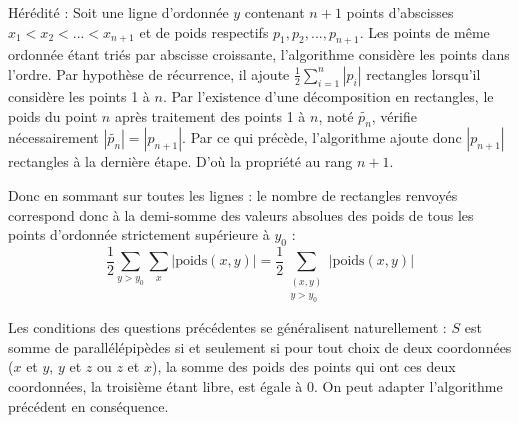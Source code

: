 Hérédité : Soit une ligne d'ordonnée $y$ contenant $n+1$ points d'abscisses $x_1 < x_2 < ... < x_{n+1}$ et de poids respectifs $p_1, p_2, ..., p_{n+1}$. Les points de même ordonnée étant triés par abscisse croissante, l'algorithme considère les points dans l'ordre. Par hypothèse de récurrence, il ajoute $\frac{1}{2} \sum_{i=1}^n|p_i|$ rectangles lorsqu'il considère les points 1 à $n$. Par l'existence d'une décomposition en rectangles, le poids du point $n$ après traitement des points 1 à $n$, noté $\tilde{p_n}$, vérifie nécessairement $|\tilde{p_n}|=|p_{n+1}|$. Par ce qui précède, l'algorithme ajoute donc $|p_{n+1}|$ rectangles à la dernière étape. D'où la propriété au rang $n+1$.
\medskip

Donc en sommant sur toutes les lignes : le nombre de rectangles renvoyés correspond donc à la demi-somme des valeurs absolues des poids de tous les points d'ordonnée strictement supérieure à $y_0$ :
\[
    \frac{1}{2} \sum_{y>y_0}\sum_{x}|\textrm{poids}(x,y)|=\frac{1}{2}\sum_{\substack{(x,y) \\ y>y_0}}|\textrm{poids}(x,y)|
\]

\Q
Les conditions des questions précédentes se généralisent naturellement : $S$ est somme de parallélépipèdes si et seulement si pour tout choix de deux coordonnées ($x$ et $y$, $y$ et $z$ ou $z$ et $x$), la somme des poids des points qui ont ces deux coordonnées, la troisième étant libre, est égale à 0. On peut adapter l'algorithme précédent en conséquence.
\bigskip

\Fin
